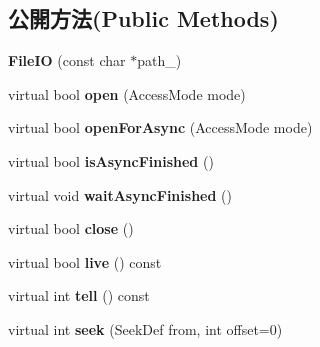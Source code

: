 \subsection*{公開方法(Public Methods)}
\begin{DoxyCompactItemize}
\item 
{\bfseries File\+IO} (const char $\ast$path\+\_\+)\hypertarget{class_magnum_1_1_file_i_o_a622f1f3857a55efd3cbae3e5ce7fbffb}{}\label{class_magnum_1_1_file_i_o_a622f1f3857a55efd3cbae3e5ce7fbffb}

\item 
virtual bool {\bfseries open} (Access\+Mode mode)\hypertarget{class_magnum_1_1_file_i_o_a3bf33683555f954f5854f97cd8536c24}{}\label{class_magnum_1_1_file_i_o_a3bf33683555f954f5854f97cd8536c24}

\item 
virtual bool {\bfseries open\+For\+Async} (Access\+Mode mode)\hypertarget{class_magnum_1_1_file_i_o_a97cd005ad13e08d09b33ad8e440ec09d}{}\label{class_magnum_1_1_file_i_o_a97cd005ad13e08d09b33ad8e440ec09d}

\item 
virtual bool {\bfseries is\+Async\+Finished} ()\hypertarget{class_magnum_1_1_file_i_o_a57231b695b6fedfc5010d3635e257710}{}\label{class_magnum_1_1_file_i_o_a57231b695b6fedfc5010d3635e257710}

\item 
virtual void {\bfseries wait\+Async\+Finished} ()\hypertarget{class_magnum_1_1_file_i_o_a5632bc0f6c84128f814d0005ec27f147}{}\label{class_magnum_1_1_file_i_o_a5632bc0f6c84128f814d0005ec27f147}

\item 
virtual bool {\bfseries close} ()\hypertarget{class_magnum_1_1_file_i_o_a2f90dd4eb613bfa22bcd9884ec1166d4}{}\label{class_magnum_1_1_file_i_o_a2f90dd4eb613bfa22bcd9884ec1166d4}

\item 
virtual bool {\bfseries live} () const \hypertarget{class_magnum_1_1_file_i_o_a8cbcf25aec5cfb8d1e98559885ee15bf}{}\label{class_magnum_1_1_file_i_o_a8cbcf25aec5cfb8d1e98559885ee15bf}

\item 
virtual int {\bfseries tell} () const \hypertarget{class_magnum_1_1_file_i_o_a8444874695c2716e3c8b0b2d3f702f0b}{}\label{class_magnum_1_1_file_i_o_a8444874695c2716e3c8b0b2d3f702f0b}

\item 
virtual int {\bfseries seek} (Seek\+Def from, int offset=0)\hypertarget{class_magnum_1_1_file_i_o_a7da6bb3e8f91a70f7b9e282f532db05b}{}\label{class_magnum_1_1_file_i_o_a7da6bb3e8f91a70f7b9e282f532db05b}


\end{DoxyCompactItemize}
